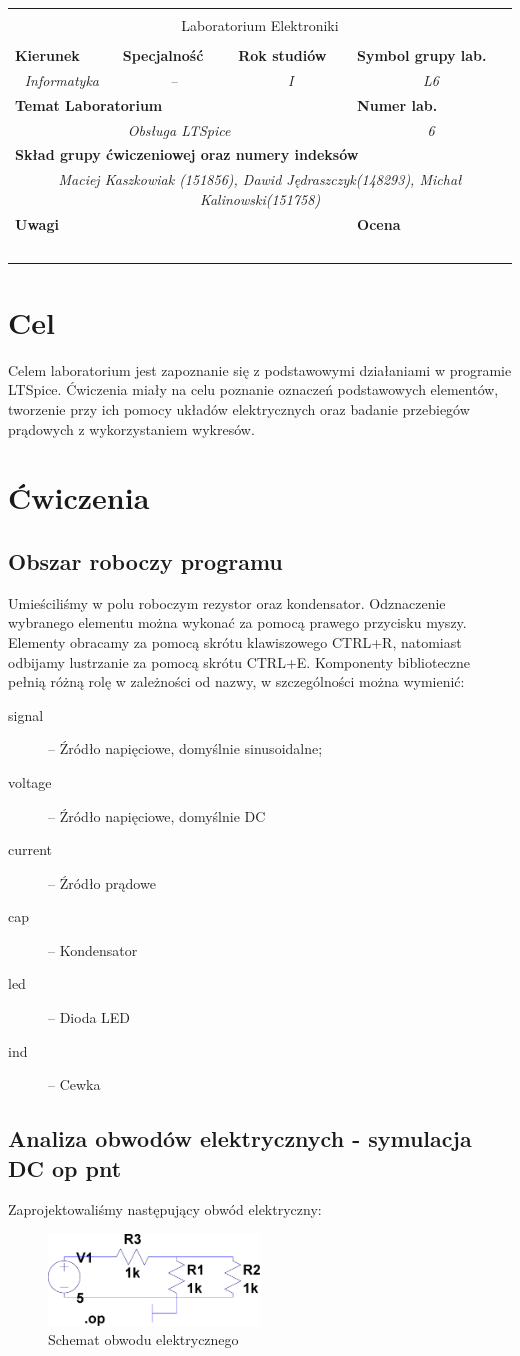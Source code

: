 \documentclass[polish,polish,a4paper]{article}
\newcommand{\PRzFieldDsc}[1]{\sffamily\bfseries\scriptsize #1}
\newcommand{\PRzFieldCnt}[1]{\textit{#1}}
\newcommand{\PRzHeading}[8]{

\begin{center}
\begin{tabular}{ p{0.32\textwidth} p{0.15\textwidth} p{0.15\textwidth} p{0.12\textwidth} p{0.12\textwidth} }

  &   &   &   &   \\
\hline
\multicolumn{5}{|c|}{}\\[-1ex]
\multicolumn{5}{|c|}{{\LARGE #1}}\\
\multicolumn{5}{|c|}{}\\[-1ex]

\hline
\multicolumn{1}{|l|}{\PRzFieldDsc{Kierunek}}	& \multicolumn{1}{|l|}{\PRzFieldDsc{Specjalność}}	& \multicolumn{1}{|l|}{\PRzFieldDsc{Rok studiów}}	& \multicolumn{2}{|l|}{\PRzFieldDsc{Symbol grupy lab.}} \\
\multicolumn{1}{|c|}{\PRzFieldCnt{#2}}		& \multicolumn{1}{|c|}{\PRzFieldCnt{#3}}		& \multicolumn{1}{|c|}{\PRzFieldCnt{#4}}		& \multicolumn{2}{|c|}{\PRzFieldCnt{#5}} \\

\hline
\multicolumn{4}{|l|}{\PRzFieldDsc{Temat Laboratorium}}		& \multicolumn{1}{|l|}{\PRzFieldDsc{Numer lab.}} \\
\multicolumn{4}{|c|}{\PRzFieldCnt{#6}}				& \multicolumn{1}{|c|}{\PRzFieldCnt{#7}} \\

\hline
\multicolumn{5}{|l|}{\PRzFieldDsc{Skład grupy ćwiczeniowej oraz numery indeksów}}\\
\multicolumn{5}{|c|}{\PRzFieldCnt{#8}}\\

\hline
\multicolumn{3}{|l|}{\PRzFieldDsc{Uwagi}}	& \multicolumn{2}{|l|}{\PRzFieldDsc{Ocena}} \\
\multicolumn{3}{|c|}{\PRzFieldCnt{\ }}		& \multicolumn{2}{|c|}{\PRzFieldCnt{\ }} \\

\hline
\end{tabular}
\end{center}
}
\begin{document}
\PRzHeading{Laboratorium Elektroniki}{Informatyka}{--}{I}{L6}{Obsługa LTSpice}{6}{Maciej Kaszkowiak (151856), Dawid Jędraszczyk(148293), Michał Kalinowski(151758)}{}

\section{Cel}
Celem laboratorium jest zapoznanie się z podstawowymi działaniami w programie LTSpice. Ćwiczenia miały na celu poznanie oznaczeń podstawowych elementów, tworzenie przy ich pomocy układów elektrycznych oraz badanie przebiegów prądowych z wykorzystaniem wykresów.

\section{Ćwiczenia}

\subsection{Obszar roboczy programu}

Umieściliśmy w polu roboczym rezystor oraz kondensator. Odznaczenie wybranego elementu można wykonać za pomocą prawego przycisku myszy. Elementy obracamy za pomocą skrótu klawiszowego CTRL+R, natomiast odbijamy lustrzanie za pomocą skrótu CTRL+E. Komponenty biblioteczne pełnią różną rolę w zależności od nazwy, w szczególności można wymienić:
\begin{description}
\item [signal] -- Źródło napięciowe, domyślnie sinusoidalne;
\item [voltage] -- Źródło napięciowe, domyślnie DC
\item [current] -- Źródło prądowe
\item [cap] -- Kondensator
\item [led] -- Dioda LED
\item [ind] -- Cewka
\end{description}

\subsection{Analiza obwodów elektrycznych - symulacja DC op pnt}

Zaprojektowaliśmy następujący obwód elektryczny:


\begin{figure}[H]
    \centering
    \includegraphics[width=0.5\textwidth]{pierwszy.eps}
    \caption{Schemat obwodu elektrycznego}
\end{figure}
\end{document}
